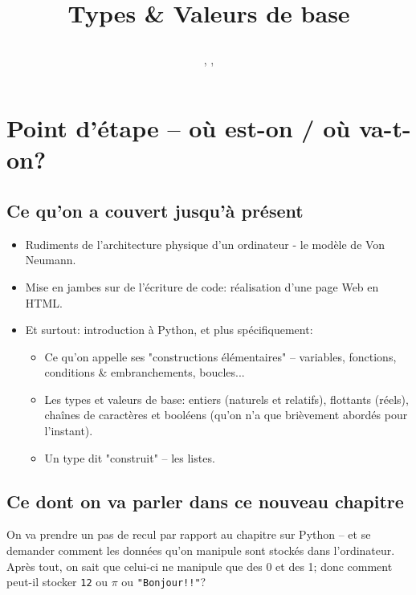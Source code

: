 \documentclass[12pt]{article}
\title
	{\vspace{3cm}
		{\Large
		\textit
			{
				\classe\hspace{0.1cm}
				\textemdash\
				\hspace{0.1cm}
				\themecours
			}
			
		\vspace{1cm}
		\huge{Types \& Valeurs de base} }
		 
		\vspace{1cm}
	}
\author{\etablissement}
\date{
	\auteur,
	\datedoc,
	\footnotesize{\textit{\versiondoc}} 
	\vspace{6cm}
	}
\begin{document}
	
	\maketitle
	\thispagestyle{empty}
		
	\section*{}
		{\noindent
		\resumecours
		}
		
	\pagebreak	
	\tableofcontents
	
	\pagebreak
	
	\section{Point d'étape -- où est-on / où va-t-on?}
	\subsection{Ce qu'on a couvert jusqu'à présent}
	
	\begin{itemize}
		\item Rudiments de l'architecture physique d'un ordinateur - le modèle de Von Neumann.
		\item Mise en jambes sur de l'écriture de code: réalisation d'une page Web en HTML.
		\item Et surtout: introduction à Python, et plus spécifiquement:
		\begin{itemize}
			\item Ce qu'on appelle ses "constructions élémentaires" -- variables, fonctions, conditions \& embranchements, boucles...
			\item Les types et valeurs de base: entiers (naturels et relatifs), flottants (réels), chaînes de caractères et booléens (qu'on n'a que brièvement abordés pour l'instant).
			\item Un type dit "construit" -- les listes.
		\end{itemize}
	\end{itemize}
	
	\subsection{Ce dont on va parler dans ce nouveau chapitre}
	On va prendre un pas de recul par rapport au chapitre sur Python -- et se demander comment les données qu'on manipule sont stockés dans l'ordinateur. Après tout, on sait que celui-ci ne manipule que des 0 et des 1; donc comment peut-il stocker \texttt{12} ou \texttt{$\pi$} ou \texttt{"Bonjour!!"}? 
	
\end{document}
